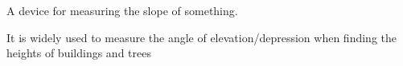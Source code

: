 A device for  measuring the slope of something.
\par
It is widely used to measure the angle of elevation/depression when finding the 
heights of buildings and trees